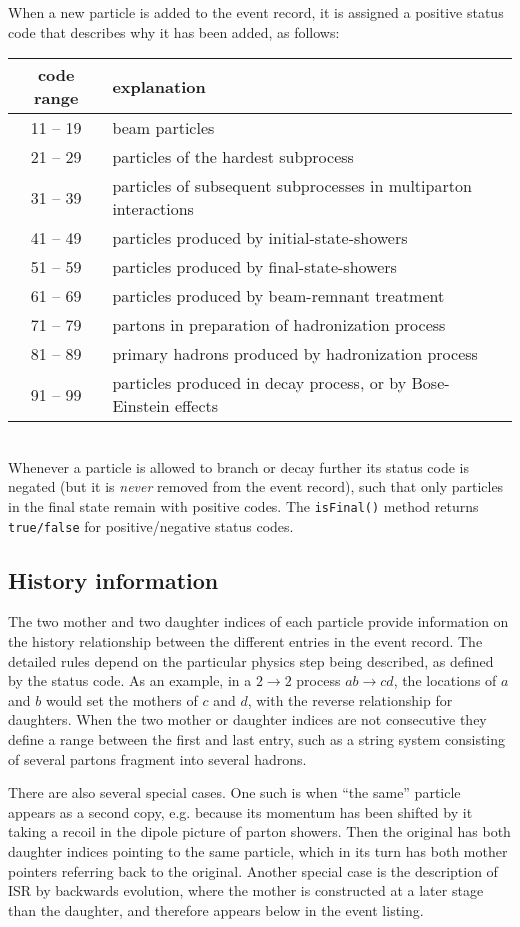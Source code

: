 \documentclass[12pt,a4paper]{article}
\begin{document}
When a new particle is added to the event record, it is assigned 
a positive status code that describes why it has been added, 
as follows:\\[2mm] 
\begin{tabular}{|c|l|}
\hline
code range & explanation \\
\hline
11 -- 19 & beam particles\\
21 -- 29 & particles of the hardest subprocess\\
31 -- 39 & particles of subsequent subprocesses in multiparton interactions\\
41 -- 49 & particles produced by initial-state-showers\\
51 -- 59 & particles produced by final-state-showers\\
61 -- 69 & particles produced by beam-remnant treatment\\
71 -- 79 & partons in preparation of hadronization process\\
81 -- 89 & primary hadrons produced by hadronization process\\
91 -- 99 & particles produced in decay process, or by Bose-Einstein effects\\ 
\hline
\end{tabular}\\[2mm]
Whenever a particle is allowed to branch or decay further its status 
code is negated (but it is \textit{never} removed from the event record), 
such that only particles in the final state remain with positive codes. The
\texttt{isFinal()} method returns \texttt{true/false} for
positive/negative status codes.

\subsection{History information}

The two mother and two daughter indices of each particle provide 
information on the history relationship between the different entries 
in the event record. The detailed rules depend on the particular physics 
step being described, as defined by the status code. As an example, 
in a $2 \to 2$ process $a b \to c d$, the locations of $a$ and $b$
would set the mothers of $c$ and $d$, with the reverse relationship
for daughters. When the two mother or daughter indices are not
consecutive they define a range between the first and last entry,
such as a string system consisting of several partons fragment into
several hadrons.

There are also several special cases. One such is when ``the same''
particle appears as a second copy, e.g. because its momentum has 
been shifted by it taking a recoil in the dipole picture of parton
showers. Then the original has both daughter indices pointing to the
same particle, which in its turn has both mother pointers referring
back to the original. Another special case is the description of 
ISR by backwards evolution, where the mother is constructed at a 
later stage than the daughter, and therefore appears below in the 
event listing. 
\end{document}
